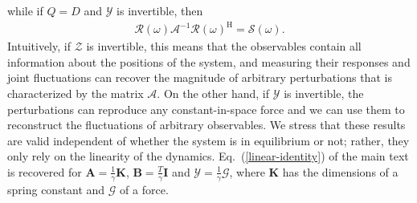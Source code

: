 \documentclass[aps,pre,twocolumn,superscriptaddress,notitlepage]{revtex4-2}
\newcommand{\bmc}[1]{\bm{\mathcal{#1}}}
\renewcommand{\eqref}[1]{Eq.~(\ref{#1})}
\begin{document}
while if $Q = D$ and $\bmc{Y}$ is invertible, then
\begin{align}
\bmc{R}(\omega) \bmc{A}^{-1} \bmc{R}(\omega)^\text{H} = \bmc{S}(\omega) .
\end{align}
Intuitively, if $\bmc{Z}$ is invertible, this means that the observables contain all information about the positions of the system, and measuring their responses and joint fluctuations can recover the magnitude of arbitrary perturbations that is characterized by the matrix $\bmc{A}$.
On the other hand, if $\bmc{Y}$ is invertible, the perturbations can reproduce any constant-in-space force and we can use them to reconstruct the fluctuations of arbitrary observables.
We stress that these results are valid independent of whether the system is in equilibrium or not; rather, they only rely on the linearity of the dynamics.
\eqref{linear-identity} of the main text is recovered for $\bm{A} = \frac{1}{\gamma} \bm{K}$, $\bm{B} = \frac{T}{\gamma} \bm{I}$ and $\bmc{Y} = \frac{1}{\gamma} \bmc{G}$, where $\bm{K}$ has the dimensions of a spring constant and $\bmc{G}$ of a force.
\end{document}
